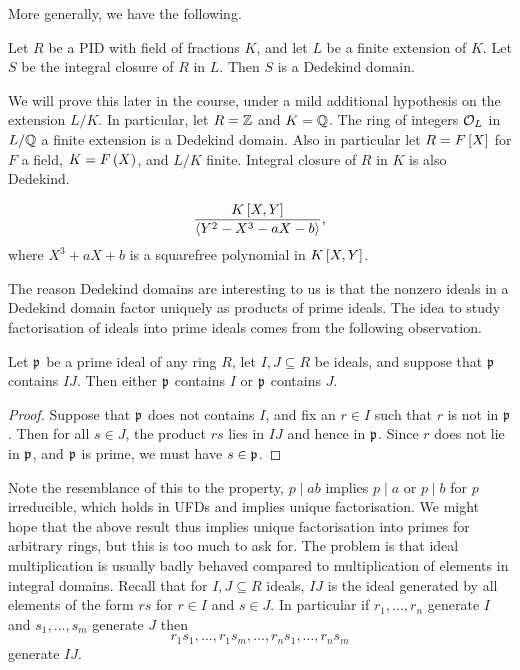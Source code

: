 More generally, we have the following.

\begin{theorem}
Let $ R $ be a PID with field of fractions $ K $, and let $ L $ be a finite extension of $ K $. Let $ S $ be the integral closure of $ R $ in $ L $. Then $ S $ is a Dedekind domain.
\end{theorem}

We will prove this later in the course, under a mild additional hypothesis on the extension $ L / K $. In particular, let $ R = \mathbb{Z} $ and $ K = \mathbb{Q} $. The ring of integers $ \mathcal{O}_L $ in $ L / \mathbb{Q} $ a finite extension is a Dedekind domain. Also in particular let $ R = F\sbr{X} $ for $ F $ a field, $ K = F\br{X} $, and $ L / K $ finite. Integral closure of $ R $ in $ K $ is also Dedekind.

\begin{example*}
$$ \dfrac{K\sbr{X, Y}}{\abr{Y^2 - X^3 - aX - b}}, $$
where $ X^3 + aX + b $ is a squarefree polynomial in $ K\sbr{X, Y} $.
\end{example*}

The reason Dedekind domains are interesting to us is that the nonzero ideals in a Dedekind domain factor uniquely as products of prime ideals. The idea to study factorisation of ideals into prime ideals comes from the following observation.

\begin{lemma}
\label{lem:11.1.3}
Let $ \mathfrak{p} $ be a prime ideal of any ring $ R $, let $ I, J \subseteq R $ be ideals, and suppose that $ \mathfrak{p} $ contains $ IJ $. Then either $ \mathfrak{p} $ contains $ I $ or $ \mathfrak{p} $ contains $ J $.
\end{lemma}

\begin{proof}
Suppose that $ \mathfrak{p} $ does not contains $ I $, and fix an $ r \in I $ such that $ r $ is not in $ \mathfrak{p} $. Then for all $ s \in J $, the product $ rs $ lies in $ IJ $ and hence in $ \mathfrak{p} $. Since $ r $ does not lie in $ \mathfrak{p} $, and $ \mathfrak{p} $ is prime, we must have $ s \in \mathfrak{p} $.
\end{proof}

\pagebreak

Note the resemblance of this to the property, $ p \mid ab $ implies $ p \mid a $ or $ p \mid b $ for $ p $ irreducible, which holds in UFDs and implies unique factorisation. We might hope that the above result thus implies unique factorisation into primes for arbitrary rings, but this is too much to ask for. The problem is that ideal multiplication is usually badly behaved compared to multiplication of elements in integral domains. Recall that for $ I, J \subseteq R $ ideals, $ IJ $ is the ideal generated by all elements of the form $ rs $ for $ r \in I $ and $ s \in J $. In particular if $ r_1, \dots, r_n $ generate $ I $ and $ s_1, \dots, s_m $ generate $ J $ then
$$ r_1s_1, \dots, r_1s_m, \dots, r_ns_1, \dots, r_ns_m $$
generate $ IJ $.

